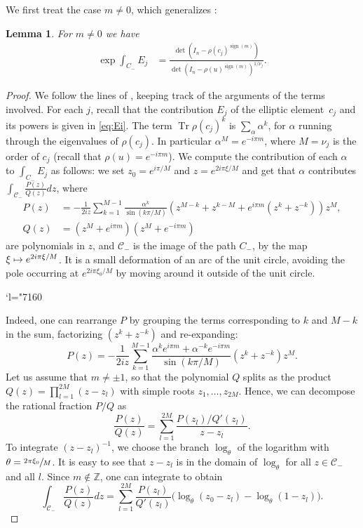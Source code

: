 \documentclass[10pt]{amsart}
\newcommand{\Changel}{\mathcode`l="7160}
\newcommand\mto{\mathchoice{\longmapsto}{\mapsto}{\mapsto}{\mapsto}}
\theoremstyle{plain}
\newtheorem{lem}[thm]{Lemma}
\theoremstyle{definition}
\theoremstyle{remark}
\newcommand{\Z}{\mathbb{Z}}
\DeclareMathOperator{\Tr}{Tr}
\DeclareMathOperator{\sign}{sign}
\numberwithin{equation}{section}
\begin{document}
We first treat the case $m\neq0$, which generalizes \cite[Lem.\,5]{fried1986fuchsian}:

\begin{lem}
\label{lem2}
For $m\neq0$ we have
\begin{align}
\label{eq:elliptic}
\exp \int_{C_-} E_j &= \frac {\det(I_n-\rho(c_j)^{\sign(m)})}{\det(I_n-\rho(u)^{\sign(m)})^{1/\nu_j} }.
\end{align}
\end{lem}
\begin{proof}
We follow the lines of \cite[proof of Lem.\,5]{fried1986fuchsian}, keeping track of the arguments of the terms involved.
For each $j$, recall that the contribution $E_j$ of the elliptic element~$c_j$ and its powers is given in \cref{eq:Ei}. The term $\Tr \rho(c_j)^k$ is $\sum_\alpha \alpha^k$, for $\alpha$ running through the eigenvalues of $\rho(c_j)$. In particular $\alpha^M = e^{-i\pi m}$, where $M = \nu_j$ is the order of $c_j$ (recall that $\rho(u) = e^{-i\pi m}$). We compute the contribution of each $\alpha$ to $\int_{C_-}E_j$ as follows:
we set $z_0 = e^{i\pi/M}$ and $z = e^{2i\pi \xi/M}$ and get that $\alpha$ contributes
$\int_{\mathcal C_-} \frac{P(z)}{Q(z)} dz$, where
\begin{align*}
P(z) &= - \frac 1 {2iz} \sum_{k=1}^{M-1} \frac {\alpha^k}{\sin(k\pi/M)} (z^{M-k}+z^{k-M} + e^{i\pi m} (z^k+z^{-k})) z^M,\\
Q(z) &= (z^M + e^{i\pi m})(z^M + e^{-i\pi m})
\end{align*}
are polynomials in $z$, and $\mathcal C_-$ is the image of the path $C_-$, by the map $\xi \mto e^{2i\pi \xi/M}$. It is a small deformation of an arc of the unit circle, avoiding the pole occurring at $e^{2i\pi \xi_0/M}$ by moving around it outside of the unit circle.

\Changel

Indeed, one can rearrange $P$ by grouping the terms corresponding to $k$ and $M-k$ in the sum, factorizing $(z^k + z^{-k})$ and re-expanding:
\[
P(z) = - \frac 1 {2iz} \sum_{k=1}^{M-1} \frac {\alpha^k e^{i\pi m} + \alpha^{-k}e^{-i\pi m}}{\sin(k\pi/M)} (z^k+z^{-k}) z^M.
\]
Let us assume that $m \neq \pm 1$, so that the polynomial $Q$ splits as the product $Q(z) = \prod_{l=1}^{2M} (z-z_l)$ with simple roots $z_1,\ldots,z_{2M}$. Hence, we can decompose the rational fraction $P/Q$ as
\[
\frac{P(z)}{Q(z)} = \sum_{l=1}^{2M} \frac{P(z_l)/Q'(z_l)}{z-z_l}.
\]
To integrate $(z-z_l)^{-1}$, we choose the branch $\log\nolimits_\theta$ of the logarithm with $\theta=\sfrac{2\pi\xi_0}{M}$. It is easy to see that $z-z_l$ is in the domain of $\log\nolimits_\theta$ for all $z\in\mathcal C_-$ and all $l$. Since $m \notin \Z$, one can integrate to obtain
\begin{equation}
\int_{\mathcal C_-} \frac{P(z)}{Q(z)}dz= \sum_{l=1}^{2M} \frac {P(z_l)}{Q'(z_l)} \big(\log\nolimits_\theta(z_0-z_l)-\log\nolimits_\theta(1-z_l)\big).\label{eq:IntPoverQ}
\end{equation}


\end{proof}
\end{document}
